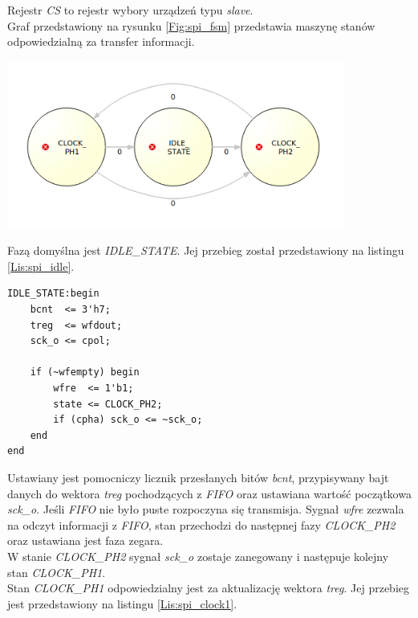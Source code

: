 \documentclass[11pt,a4paper]{article}
\begin{document}
Rejestr \textit{CS} to rejestr wybory urządzeń typu \textit{slave}. \\
Graf przedstawiony na rysunku \ref{Fig:spi_fsm} przedstawia maszynę stanów odpowiedzialną za transfer informacji. \\

					\begin{minipage}[c]{\textwidth}
					\includegraphics[width=\textwidth,height=5.5cm]{./rysunki/fsm_spi.png}
			\end{minipage} 
			 Fazą domyślna jest \textit{IDLE\_STATE}. Jej przebieg został przedstawiony na listingu \ref{Lis:spi_idle}.
			 \begin{minipage}{\textwidth}
\begin{scriptsize}
\begin{lstlisting}[label=Lis:spi_idle,caption=Faza \textit{IDLE\_STATE}]
IDLE_STATE:begin 
	bcnt  <= 3'h7;   
	treg  <= wfdout; 
	sck_o <= cpol;   

	if (~wfempty) begin
		wfre  <= 1'b1;
		state <= CLOCK_PH2;
		if (cpha) sck_o <= ~sck_o;
	end
end
\end{lstlisting}
\end{scriptsize}
\end{minipage}	
Ustawiany jest pomocniczy licznik przesłanych bitów \textit{bcnt}, przypisywany bajt danych do wektora \textit{treg} pochodzących z \textit{FIFO} oraz ustawiana wartość początkowa \textit{sck\_o}. Jeśli \textit{FIFO} nie było puste rozpoczyna się transmisja. Sygnał \textit{wfre} zezwala na odczyt informacji z \textit{FIFO}, stan przechodzi do następnej fazy \textit{CLOCK\_PH2} oraz ustawiana jest faza zegara. \\
W stanie \textit{CLOCK\_PH2} sygnał \textit{sck\_o} zostaje zanegowany i następuje kolejny stan \textit{CLOCK\_PH1}. \\
 Stan \textit{CLOCK\_PH1} odpowiedzialny jest za aktualizację wektora \textit{treg}. Jej przebieg jest przedstawiony na listingu \ref{Lis:spi_clock1}.\\
\end{document}
